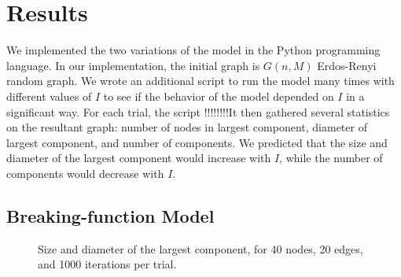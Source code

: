 \documentclass[a4paper,10pt]{article}
\begin{document}
\section{Results}

We implemented the two variations of the model in the Python programming language. In our implementation, the initial graph is $G(n, M)$ Erdos-Renyi random graph. We wrote an additional script to run the model many times with different values of $I$ to see if the behavior of the model depended on $I$ in a significant way. For each trial, the script !!!!!!!!It then gathered several statistics on the resultant graph: number of nodes in largest component, diameter of largest component, and number of components. We predicted that the size and diameter of the largest component would increase with $I$, while the number of components would decrease with $I$. 

\subsection{Breaking-function Model}

\begin{figure}[H]
\begin{center}
\caption{Size and diameter of the largest component, for 40 nodes, 20 edges, and 1000 iterations per trial.}
\end{center}
\end{figure} 
\end{document}
